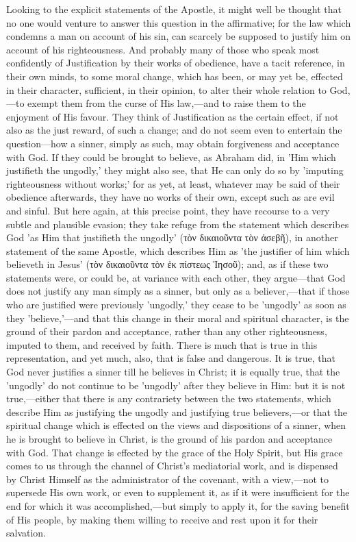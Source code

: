 \documentclass[
]{book}
\begin{document}
Looking to the explicit statements of the Apostle, it might well be thought that no one would venture to answer this question in the affirmative; for the law which condemns a man on account of his sin, can scarcely be supposed to justify him on account of his righteousness. And probably many of those who speak most confidently of Justification by their works of obedience, have a tacit reference, in their own minds, to some moral change, which has been, or may yet be, effected in their character, sufficient, in their opinion, to alter their whole relation to God,---to exempt them from the curse of His law,---and to raise them to the enjoyment of His favour. They think of Justification as the certain effect, if not also as the just reward, of such a change; and do not seem even to entertain the question---how a sinner, simply as such, may obtain forgiveness and acceptance with God. If they could be brought to believe, as Abraham did, in 'Him which justifieth the ungodly,' they might also see, that He can only do so by 'imputing righteousness without works;' for as yet, at least, whatever may be said of their obedience afterwards, they have no works of their own, except such as are evil and sinful. But here again, at this precise point, they have recourse to a very subtle and plausible evasion; they take refuge from the statement which describes God 'as Him that justifieth the ungodly' (τὸν δικαιοῦντα τὸν ἀσεβῆ), in another statement of the same Apostle, which describes Him as 'the justifier of him which believeth in Jesus' (τὸν δικαιοῦντα τὸν ἐκ πίστεως Ἰησοῦ); and, as if these two statements were, or could be, at variance with each other, they argue---that God does not justify any man simply as a sinner, but only as a believer,---that if those who are justified were previously 'ungodly,' they cease to be 'ungodly' as soon as they 'believe,'---and that this change in their moral and spiritual character, is the ground of their pardon and acceptance, rather than any other righteousness, imputed to them, and received by faith. There is much that is true in this representation, and yet much, also, that is false and dangerous. It is true, that God never justifies a sinner till he believes in Christ; it is equally true, that the 'ungodly' do not continue to be 'ungodly' after they believe in Him: but it is not true,---either that there is any contrariety between the two statements, which describe Him as justifying the ungodly and justifying true believers,---or that the spiritual change which is effected on the views and dispositions of a sinner, when he is brought to believe in Christ, is the ground of his pardon and acceptance with God. That change is effected by the grace of the Holy Spirit, but His grace comes to us through the channel of Christ's mediatorial work, and is dispensed by Christ Himself as the administrator of the covenant, with a view,---not to supersede His own work, or even to supplement it, as if it were insufficient for the end for which it was accomplished,---but simply to apply it, for the saving benefit of His people, by making them willing to receive and rest upon it for their salvation.
\end{document}
